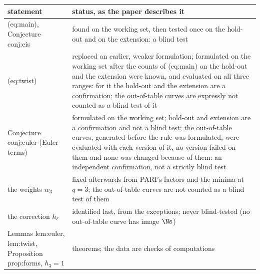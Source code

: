 \begin{sloppypar}
\begin{center}\small
\begin{tabular}{p{}p{}}
\toprule
statement & status, as the paper describes it\\
\midrule
(eq:main), Conjecture conj:eis & found on the working set, then tested once on the hold-out and on the extension: a blind test\\
(eq:twist) & replaced an earlier, weaker formulation; formulated on the working set after the counts of (eq:main) on the hold-out and the extension were known, and evaluated on all three ranges: for it the hold-out and the extension are a confirmation; the out-of-table curves are expressly not counted as a blind test of it\\
Conjecture conj:euler (Euler terms) & formulated on the working set; hold-out and extension are a confirmation and not a blind test; the out-of-table curves, generated before the rule was formulated, were evaluated with each version of it, no version failed on them and none was changed because of them: an independent confirmation, not a strictly blind test\\
the weights $w_3$ & fixed afterwards from PARI's factors and the minima at $q=3$; the out-of-table curves are not counted as a blind test of them\\
the correction $h_\ell$ & identified last, from the exceptions; never blind-tested (no out-of-table curve has image $\Ns$)\\
Lemmas lem:euler, lem:twist, Proposition prop:forms, $h_3=1$ & theorems; the data are checks of computations\\
\bottomrule
\end{tabular}
\end{center}


\end{sloppypar}
